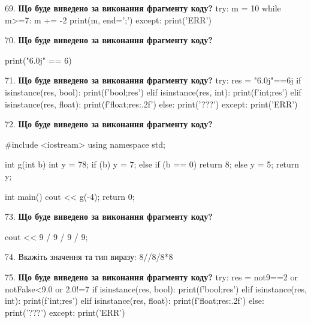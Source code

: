 \documentclass[11pt]{article}
\begin{document}
69. \textbf{Що буде виведено за виконання фрагменту коду?}
try:
    m = 10
    while m>=7:
        m += -2
    print(m, end=';')
except:
    print('ERR')
\par\vspace{5mm}

70. \textbf{Що буде виведено за виконання фрагменту коду?}

print("6.0j" == 6)
\par\vspace{5mm}

71. \textbf{Що буде виведено за виконання фрагменту коду?}
try:
    res = "6.0j"==6j
    if isinstance(res, bool):
        print(f'bool;{res}')
    elif isinstance(res, int):
        print(f'int;{res}')
    elif isinstance(res, float):
        print(f'float;{res:.2f}')
    else:
        print('???')
except:
    print('ERR')
\par\vspace{5mm}

72. \textbf{Що буде виведено за виконання фрагменту коду?}

#include <iostream>
using namespace std;

int g(int b){
    int y = 78;
    if (b) 
        y = 7;
    else if (b == 0)
         return 8;
    else
         y = 5;
    return y;
}

int main(){
    cout << g(-4);
    return 0;
}

\par\vspace{5mm}

73. \textbf{Що буде виведено за виконання фрагменту коду?}

cout << 9 / 9 / 9 / 9;
\par\vspace{5mm}

74. 
Вкажіть значення та тип виразу:
8//8/8*8
\par\vspace{5mm}

75. \textbf{Що буде виведено за виконання фрагменту коду?}
try:
    res = not9==2 or notFalse<9.0 or 2.0!=7
    if isinstance(res, bool):
        print(f'bool;{res}')
    elif isinstance(res, int):
        print(f'int;{res}')
    elif isinstance(res, float):
        print(f'float;{res:.2f}')
    else:
        print('???')
except:
    print('ERR')
\par\vspace{5mm}
\end{document}
